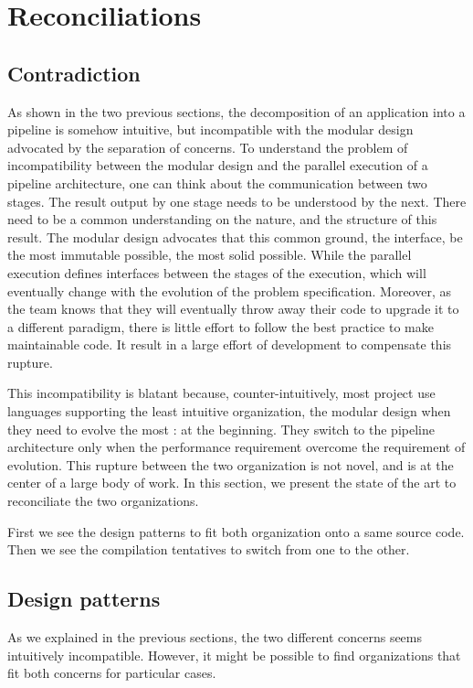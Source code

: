 \section{Reconciliations}

\subsection{Contradiction}

As shown in the two previous sections, the decomposition of an application into a pipeline is somehow intuitive, but incompatible with the modular design advocated by the separation of concerns.
To understand the problem of incompatibility between the modular design and the parallel execution of a pipeline architecture, one can think about the communication between two stages.
The result output by one stage needs to be understood by the next.
There need to be a common understanding on the nature, and the structure of this result.
The modular design advocates that this common ground, the interface, be the most immutable possible, the most solid possible.
While the parallel execution defines interfaces between the stages of the execution, which will eventually change with the evolution of the problem specification.
Moreover, as the team knows that they will eventually throw away their code to upgrade it to a different paradigm, there is little effort to follow the best practice to make maintainable code.
It result in a large effort of development to compensate this rupture.

This incompatibility is blatant because, counter-intuitively, most project use languages supporting the least intuitive organization, the modular design when they need to evolve the most : at the beginning.
They switch to the pipeline architecture only when the performance requirement overcome the requirement of evolution.
This rupture between the two organization is not novel, and is at the center of a large body of work.
In this section, we present the state of the art to reconciliate the two organizations.

First we see the design patterns to fit both organization onto a same source code.
Then we see the compilation tentatives to switch from one to the other.


\subsection{Design patterns}

As we explained in the previous sections, the two different concerns seems intuitively incompatible.
However, it might be possible to find organizations that fit both concerns for particular cases.

